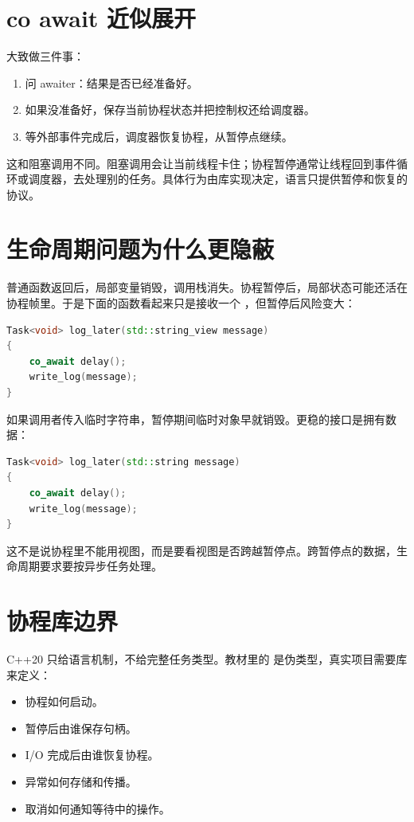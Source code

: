 \section{co await 近似展开}

 大致做三件事：

\begin{enumerate}
  \item 问 awaiter：结果是否已经准备好。
  \item 如果没准备好，保存当前协程状态并把控制权还给调度器。
  \item 等外部事件完成后，调度器恢复协程，从暂停点继续。
\end{enumerate}

这和阻塞调用不同。阻塞调用会让当前线程卡住；协程暂停通常让线程回到事件循环或调度器，去处理别的任务。具体行为由库实现决定，语言只提供暂停和恢复的协议。

\section{生命周期问题为什么更隐蔽}

普通函数返回后，局部变量销毁，调用栈消失。协程暂停后，局部状态可能还活在协程帧里。于是下面的函数看起来只是接收一个 ，但暂停后风险变大：

\begin{lstlisting}[language=C++,caption={跨暂停点保存视图}]
Task<void> log_later(std::string_view message)
{
    co_await delay();
    write_log(message);
}
\end{lstlisting}

如果调用者传入临时字符串，暂停期间临时对象早就销毁。更稳的接口是拥有数据：

\begin{lstlisting}[language=C++,caption={协程跨暂停点拥有字符串}]
Task<void> log_later(std::string message)
{
    co_await delay();
    write_log(message);
}
\end{lstlisting}

这不是说协程里不能用视图，而是要看视图是否跨越暂停点。跨暂停点的数据，生命周期要求要按异步任务处理。

\section{协程库边界}

C++20 只给语言机制，不给完整任务类型。教材里的  是伪类型，真实项目需要库来定义：

\begin{itemize}
  \item 协程如何启动。
  \item 暂停后由谁保存句柄。
  \item I/O 完成后由谁恢复协程。
  \item 异常如何存储和传播。
  \item 取消如何通知等待中的操作。
\end{itemize}


